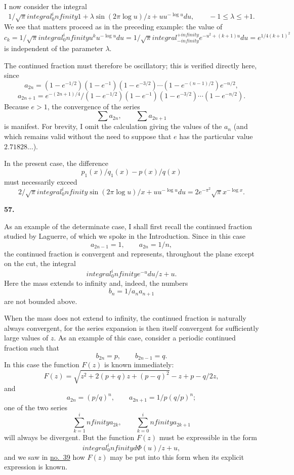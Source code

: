 \documentclass[
  paper=b5,
  fontsize=13pt,
  twoside,
  headings=normal,
  bookmarkpackage=false
]{scrartcl}
\theoremstyle{stieltjesplain}
\theoremstyle{stieltjesdefinition}
\def\int{integral}%
\def\frac#1#2{#1/#2}%
\def\infty{infinity}%
\def\,{ }%
\newcommand{\origsection}[1]{%
  \par\addvspace{0.85\baselineskip}%
  \phantomsection\label{sec:#1}%
  \addcontentsline{toc}{subsection}{\texorpdfstring{\S~#1}{Section #1}}%
  \noindent\textbf{#1.}\quad\ignorespaces
}
\begin{document}
I now consider the integral
\[
  \frac{1}{\sqrt{\pi}}\int_0^\infty
  \frac{1+\lambda\sin(2\pi\log u)}{z+u}\,
  u^{-\log u}\,du,
  \qquad -1\leq\lambda\leq+1.
\]
We see that matters proceed as in the preceding example: the value of
\[
  c_k=\frac{1}{\sqrt{\pi}}\int_0^\infty u^k u^{-\log u}\,du
  =\frac{1}{\sqrt{\pi}}\int_{-\infty}^{+\infty}
  e^{-u^2+(k+1)u}\,du
  =e^{\frac14(k+1)^2}
\]
is independent of the parameter $\lambda$.

The continued fraction must therefore be oscillatory; this is verified directly here, since
\[
  a_{2n}
  =(1-e^{-1/2})(1-e^{-1})(1-e^{-3/2})\cdots
   (1-e^{-(n-1)/2})e^{-n/2},
\]
\[
  a_{2n+1}
  =\frac{e^{-(2n+1)/4}}
  {(1-e^{-1/2})(1-e^{-1})(1-e^{-3/2})\cdots(1-e^{-n/2})}.
\]
Because $e>1$, the convergence of the series
\[
  \sum a_{2n},\qquad \sum a_{2n+1}
\]
is manifest. For brevity, I omit the calculation giving the values of the $a_n$ (and which remains valid without the need to suppose that $e$ has the particular value $2.71828\ldots$).

In the present case, the difference
\[
  \frac{p_1(x)}{q_1(x)}-\frac{p(x)}{q(x)}
\]
must necessarily exceed
\[
  \frac{2}{\sqrt{\pi}}\int_0^\infty
  \frac{\sin(2\pi\log u)}{x+u}u^{-\log u}\,du
  =2e^{-\pi^2}\sqrt{\pi}\,x^{-\log x}.
\]

\origsection{57}
As an example of the determinate case, I shall first recall the continued fraction studied by Laguerre, of which we spoke in the Introduction. Since in this case
\[
  a_{2n-1}=1,\qquad a_{2n}=\frac1n,
\]
the continued fraction is convergent and represents, throughout the plane except on the cut, the integral
\[
  \int_0^\infty\frac{e^{-u}\,du}{z+u}.
\]
Here the mass extends to infinity and, indeed, the numbers
\[
  b_n=\frac{1}{a_na_{n+1}}
\]
are not bounded above.

When the mass does not extend to infinity, the continued fraction is naturally always convergent, for the series expansion is then itself convergent for sufficiently large values of $z$. As an example of this case, consider a periodic continued fraction such that
\[
  b_{2n}=p,\qquad b_{2n-1}=q.
\]
In this case the function $F(z)$ is known immediately:
\[
  F(z)=
  \frac{\sqrt{z^2+2(p+q)z+(p-q)^2}-z+p-q}{2z},
\]
and
\[
  a_{2n}=\left(\frac pq\right)^n,
  \qquad
  a_{2n+1}=\frac1p\left(\frac qp\right)^n;
\]
one of the two series
\[
  \sum_{k=1}^\infty a_{2k},
  \qquad
  \sum_{k=0}^\infty a_{2k+1}
\]
will always be divergent. But the function $F(z)$ must be expressible in the form
\[
  \int_0^\infty\frac{d\Phi(u)}{z+u},
\]
and we saw in \hyperref[sec:39]{no.~39} how $F(z)$ may be put into this form when its explicit expression is known.
\end{document}
